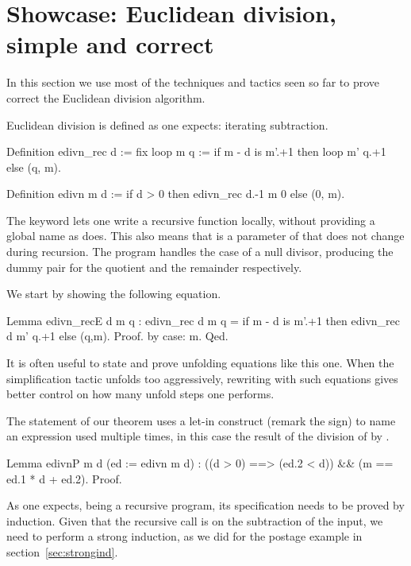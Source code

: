 \clearpage
\section{Showcase: Euclidean division, simple and correct}\label{sec:edivn}
\label{sec:realproofs}

In this section we use most
of the techniques and tactics seen so far to prove correct the
Euclidean division algorithm.

Euclidean division is defined as one expects: iterating subtraction.

\begin{coq}{}{}
Definition edivn_rec d :=
  fix loop m q := if m - d is m'.+1 then loop m' q.+1 else (q, m).

Definition edivn m d := if d > 0 then edivn_rec d.-1 m 0 else (0, m).
\end{coq}

The  keyword lets one write a recursive function locally, without
providing a global name as  does.  This also means that 
is a parameter of  that does not change during recursion.
The  program handles the case of a null divisor, producing
the dummy pair  for the quotient and the remainder respectively.

We start by showing the following equation.

\begin{coq}{}{}
Lemma edivn_recE d m q :
 edivn_rec d m q = if m - d is m'.+1 then edivn_rec d m' q.+1 else (q,m).
Proof. by case: m. Qed.
\end{coq}
It is often useful to state and prove unfolding equations like this one.
When the simplification tactic \C{/=} unfolds too aggressively,
rewriting with such equations gives better control on how many
unfold steps one performs.

The statement of our theorem
uses a let-in construct (remark the \C{:=} sign)
to name an expression used multiple
times, in this case the result of the division of  by .

\begin{coq}{}{}
Lemma edivnP m d (ed := edivn m d) :
  ((d > 0) ==> (ed.2 < d)) && (m == ed.1 * d + ed.2).
Proof.
\end{coq}

As one expects,  being a recursive program, its specification
needs to be proved by induction.  Given that the recursive call is on
the subtraction of the input, we need to perform a strong induction,
as we did for the postage example in section~\ref{sec:strongind}.

